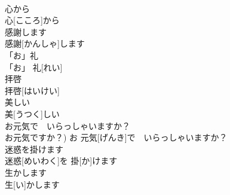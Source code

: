 \documentclass[8pt]{extreport}
\begin{document}
\begin{CJK}{UTF8}{min}
\\	心から	
\\	心[こころ]から	
\\	感謝します	
\\	感謝[かんしゃ]します	
\\	「お」礼	
\\	「お」 礼[れい]	
\\	拝啓	
\\	拝啓[はいけい]	
\\	美しい	
\\	美[うつく]しい	
\\	お元気で　いらっしゃいますか？	
\\	お元気ですか？)	お 元気[げんき]で　いらっしゃいますか？	
\\	迷惑を掛けます	
\\	迷惑[めいわく]を 掛[か]けます	
\\	生かします	
\\	生[い]かします	
\end{CJK}
\end{document}
